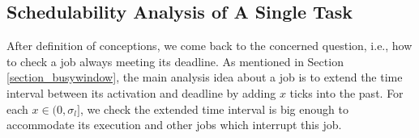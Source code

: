 \documentclass[10pt,conference]{IEEEtran}
\begin{document}

\subsection{Schedulability Analysis of A Single Task}
After definition of conceptions, we come back to the concerned question, i.e., how to check a job always meeting its deadline. As mentioned in Section \ref{section_busywindow}, the main analysis idea about a job is to extend the time interval between its activation and deadline by adding $x$ ticks into the past. For each $x\in(0,\sigma_l]$, we check the extended time interval is big enough to accommodate its execution and other jobs which interrupt this job. 
\end{document}
